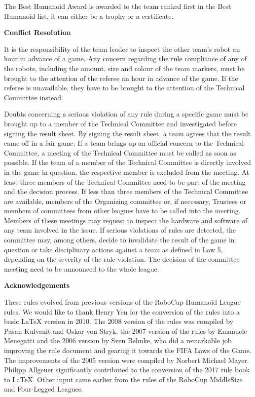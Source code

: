 \bigskip

The Best Humanoid Award is awarded to the team ranked first in the Best Humanoid list,
it can either be a trophy or a certificate.

\bigskip

{\bfseries Conflict Resolution}

\headlinebox

It is the responsibility of the team leader to inspect the other team's robot an hour in advance of a game. Any concern regarding the rule compliance of any of the robots, including the amount, size and colour of the team markers, must be brought to the attention of the referee an hour in advance of the game. If the referee is unavailable, they have to be brought to the attention of the Technical Committee instead.

\bigskip

Doubts concerning a serious violation of any rule during a specific game must be brought up to a member of the Technical Committee and investigated before signing the result sheet. By signing the result sheet, a team agrees that the result came off in a fair game. If a team brings up an official concern to the Technical Committee, a meeting of the Technical Committee must be called as soon as possible. If the team of a member of the Technical Committee is directly involved in the game in question, the respective member is excluded from the meeting. At least three members of the Technical Committee need to be part of the meeting and the decision process. If less than three members of the Technical Committee are available, members of the Organizing committee or, if necessary, Trustees or members of committees from other leagues have to be called into the meeting. Members of these meetings may request to inspect the hardware and software of any team involved in the issue. If serious violations of rules are detected, the committee may, among others, decide to invalidate the result of the game in question or take disciplinary actions against a team as defined in Law 5, depending on the severity of the rule violation. The decision of the committee meeting need to be announced to the whole league.

\bigskip

{\bfseries Acknowledgements}

\headlinebox

These rules evolved from previous versions of the RoboCup Humanoid League rules. We would like to thank Henry Yen for the conversion of the rules into a basic LaTeX version in 2010. The 2008 version of the rules was compiled by Pasan Kulvanit and Oskar von Stryk, the 2007 version of the rules by Emanuele Menegatti and the 2006 version by Sven Behnke, who did a remarkable job improving the rule document and gearing it towards the FIFA Laws of the Game. The improvements of the 2005 version were compiled by Norbert Michael Mayer. Philipp Allgeuer significantly contributed to the conversion of the 2017 rule book to LaTeX.  Other input came earlier from the rules of the RoboCup MiddleSize and Four-Legged Leagues.

